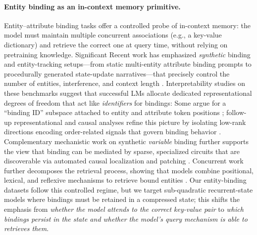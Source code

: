 \paragraph{Entity binding as an in-context memory primitive.}
Entity--attribute binding tasks offer a controlled probe of in-context memory:
the model must maintain multiple concurrent associations (e.g., a key-value dictionary) and retrieve the
correct one at query time, without relying on pretraining knowledge. Significant
Recent work has emphasized \emph{synthetic} binding and entity-tracking
setups---from static multi-entity attribute binding prompts to procedurally
generated state-update narratives---that precisely control the number of
entities, interference, and context length
\cite{feng2024binding,kim2023entitytracking,prakash2024finetuning,dai2024bindinganalysis}.
Interpretability studies on these benchmarks suggest that successful LMs allocate
dedicated representational degrees of freedom that act like \emph{identifiers}
for bindings: Some argue for a ``binding ID'' subspace attached
to entity and attribute token positions \cite{feng2024binding};
follow-up representational and causal analyses refine this picture by isolating
low-rank directions encoding order-related signals that govern binding behavior
\cite{dai2024bindinganalysis}.
Complementary mechanistic work on synthetic \emph{variable} binding further
supports the view that binding can be mediated by sparse, specialized circuits
that are discoverable via automated causal localization and patching
\cite{davies2023desiderata,wu2025variablebinding}.
Concurrent work further decomposes the retrieval process, showing that models combine positional, lexical, and reflexive mechanisms to retrieve bound entities \cite{gurarieh2025mixing}.
Our entity-binding datasets follow this controlled regime, but we target
sub-quadratic recurrent-state models where bindings must be retained in a
compressed state; this shifts the emphasis from \emph{whether the model attends
to the correct key-value pair} to \emph{which bindings persist in the state and whether the
model’s query mechanism is able to retrieves them}.



